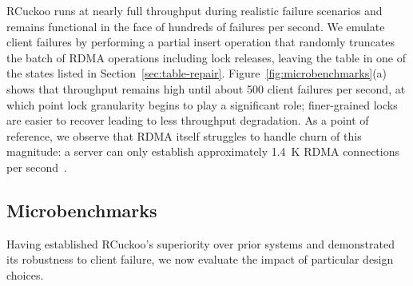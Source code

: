 RCuckoo runs at nearly full throughput during realistic
failure scenarios and remains functional in the face of
hundreds of failures per second.
We emulate client failures by
performing a partial insert operation that randomly truncates the
batch of RDMA operations including lock releases, leaving the table
in one of the  states listed in
Section~\ref{sec:table-repair}.
Figure~\ref{fig:microbenchmarks}(a) shows that
throughput remains high until about 500 client failures per second, at
which point lock granularity begins to play a significant role;
finer-grained locks are easier to recover leading to less throughput
degradation.
As a point of reference, we observe that RDMA itself struggles to handle churn of this magnitude:
a server can only
establish approximately 1.4~K RDMA connections per second~\cite{xrdma}.

\subsection{Microbenchmarks}
\label{ss:mb}

Having established RCuckoo's superiority over prior systems and
demonstrated its robustness to client failure, we now evaluate the
impact of particular design choices.






